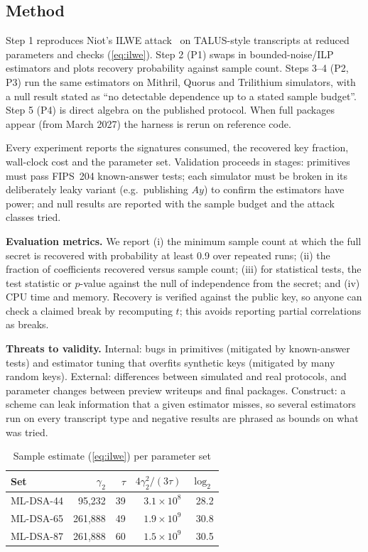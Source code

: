 \documentclass[10pt,conference,a4paper]{IEEEtran}
\begin{document}
\subsection{Method}
Step 1 reproduces Niot's ILWE attack~\cite{niot} on TALUS-style transcripts at reduced parameters and checks
(\ref{eq:ilwe}). Step 2 (P1) swaps in bounded-noise/ILP estimators and plots recovery probability against sample count.
Steps 3--4 (P2, P3) run the same estimators on Mithril, Quorus and Trilithium simulators, with a null result stated as
``no detectable dependence up to a stated sample budget''. Step 5 (P4) is direct algebra on the published protocol.
When full packages appear (from March 2027) the harness is rerun on reference code.

Every experiment reports the signatures consumed, the recovered key fraction, wall-clock cost and the parameter set.
Validation proceeds in stages: primitives must pass FIPS~204 known-answer tests; each simulator must be broken in its
deliberately leaky variant (e.g.\ publishing $Ay$) to confirm the estimators have power; and null results are reported
with the sample budget and the attack classes tried.

\textbf{Evaluation metrics.} We report (i) the minimum sample count at which the full secret is recovered with
probability at least 0.9 over repeated runs; (ii) the fraction of coefficients recovered versus sample count; (iii) for
statistical tests, the test statistic or $p$-value against the null of independence from the secret; and (iv) CPU time
and memory. Recovery is verified against the public key, so anyone can check a claimed break by recomputing $t$; this
avoids reporting partial correlations as breaks.

\textbf{Threats to validity.} Internal: bugs in primitives (mitigated by known-answer tests) and estimator tuning that
overfits synthetic keys (mitigated by many random keys). External: differences between simulated and real protocols, and
parameter changes between preview writeups and final packages. Construct: a scheme can leak information that a given
estimator misses, so several estimators run on every transcript type and negative results are phrased as bounds on what
was tried.

\begin{table}[t]
\caption{Sample estimate (\ref{eq:ilwe}) per parameter set}\label{tab:ilwe}
\centering\footnotesize
\begin{tabular}{@{}lrrrr@{}}
\toprule
Set & $\gamma_2$ & $\tau$ & $4\gamma_2^2/(3\tau)$ & $\log_2$\\
\midrule
ML-DSA-44 & 95{,}232 & 39 & $3.1\times10^8$ & 28.2\\
ML-DSA-65 & 261{,}888 & 49 & $1.9\times10^9$ & 30.8\\
ML-DSA-87 & 261{,}888 & 60 & $1.5\times10^9$ & 30.5\\
\bottomrule
\end{tabular}
\end{table}
\end{document}
